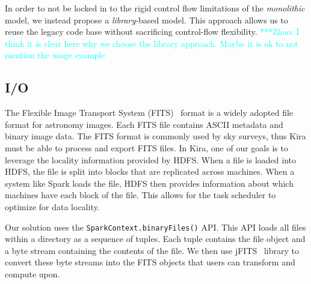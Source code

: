 \documentclass[conference]{IEEEtran}
\newcommand{\zhaonote}[1]{{\textcolor{cyan}    { ***Zhao:      #1 }}}
\newcommand{\zhaonote}[1]{}
\begin{document}
In order to not be locked in to the rigid control flow limitations of the \emph{monolithic} model, 
we instead propose a \emph{library}-based model.
This approach allows us to reuse the legacy code base without sacrificing control-flow flexibility.  
\zhaonote{I think it is clear here why we choose the library approach. Maybe it is ok to not mention the usage example}



\subsection{I/O}
\label{sec:Design-I/O}
The Flexible Image Transport System (FITS)~\cite{wells81} format is a widely adopted file format for astronomy
images. Each FITS file contains ASCII metadata and binary image data.
The FITS format is commonly used by sky surveys, thus Kira must be able to process and export FITS files.
In Kira, one of our goals is to leverage the locality information provided by HDFS. When a file is loaded into 
HDFS, the file is split into blocks that are replicated across machines. When a system like Spark loads the file, 
HDFS then provides information about which machines have each block of the file. This allows for the task 
scheduler to optimize for data locality.


Our solution uses the \texttt{SparkContext.binaryFiles()} API.
This API loads all files within a directory as a sequence of tuples. Each tuple contains the file object and a byte
stream containing the contents of the file. We then use jFITS~\cite{jfits} library to convert these byte streams 
into the FITS objects that users can transform and compute upon. 

 
\end{document}
